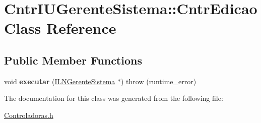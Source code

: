 \hypertarget{class_cntr_i_u_gerente_sistema_1_1_cntr_edicao}{}\section{Cntr\+I\+U\+Gerente\+Sistema\+:\+:Cntr\+Edicao Class Reference}
\label{class_cntr_i_u_gerente_sistema_1_1_cntr_edicao}
\subsection*{Public Member Functions}
\begin{DoxyCompactItemize}
\item 
\hypertarget{class_cntr_i_u_gerente_sistema_1_1_cntr_edicao_ac269636839b899dcf788da0f2c688fad}{}\label{class_cntr_i_u_gerente_sistema_1_1_cntr_edicao_ac269636839b899dcf788da0f2c688fad} 
void {\bfseries executar} (\hyperlink{class_i_l_n_gerente_sistema}{I\+L\+N\+Gerente\+Sistema} $\ast$)  throw (runtime\+\_\+error)
\end{DoxyCompactItemize}


The documentation for this class was generated from the following file\+:\begin{DoxyCompactItemize}
\item 
\hyperlink{_controladoras_8h}{Controladoras.\+h}\end{DoxyCompactItemize}
